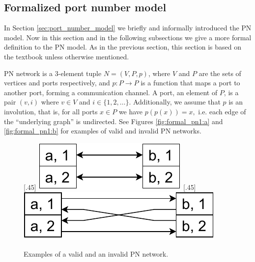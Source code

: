 \subsection{Formalized port number model} \label{sec:formalized_pn_model}
In Section \ref{sec:port_number_model} we briefly and informally introduced the PN model.
Now in this section and in the following subsections we give a more formal definition to the PN model.
As in the previous section, this section is based on the textbook \cite{HirvonenSuomelaDistAlg2020} unless otherwise mentioned.

PN network is a 3-element tuple $N = (V, P, p)$, where $V$ and $P$ are the sets of vertices and ports respectively, and $p\colon P \rightarrow P$ is a function that maps a port to another port, forming a communication channel.
A port, an element of $P$, is a pair $(v, i)$ where $v \in V$ and $i \in \{1, 2, \dotsc\}$.
Additionally, we assume that $p$ is an involution, that is, for all ports $x \in P$ we have $p(p(x)) = x, $ i.e. each edge of the ``underlying graph'' is undirected.
See Figures \ref{fig:formal_pn1:a} and \ref{fig:formal_pn1:b} for examples of valid and invalid PN networks.

\begin{figure}[H]
    [.45\linewidth] {
    \centering
    \includegraphics[scale=0.6]{diagrams/formalizing_pn_network_diagram1.pdf}
  }
  \hfill
    [.45\linewidth] {
    \centering
    \includegraphics[scale=0.6]{diagrams/formalizing_pn_network_diagram2.pdf}
  }
  \caption{Examples of a valid and an invalid PN network.}
  \label{fig:formal_pn1}
\end{figure}


